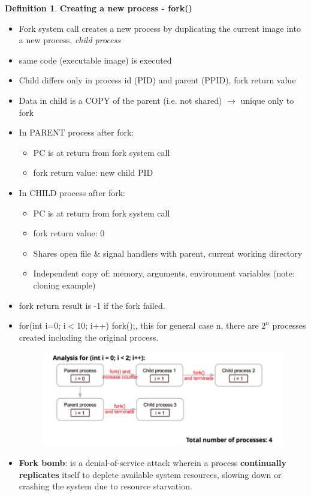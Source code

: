 \documentclass[11pt,a4paper]{article}
\theoremstyle{definition}
\newtheorem{definition}{Definition}[section]
\newenvironment{myitemize}
{ \begin{itemize}
    \setlength{\itemsep}{5pt}
    \setlength{\parskip}{0pt}
    \setlength{\parsep}{0pt}     }
{ \end{itemize}                  }
\begin{document}
\begin{definition}{\textbf{Creating a new process - \textsf{fork()}}}
	\begin{myitemize}
		\item Fork system call creates a new process by duplicating the current image into a new process, \textit{child process}
		\item \textsf{same code} (executable image) is executed
		\item Child differs only in process id (PID) and parent (PPID), fork return value
		\item Data in child is a COPY of the parent (i.e. not shared) $\rightarrow$ unique only to fork
		\item In PARENT process after fork:
		\begin{myitemize}
			\item PC is at return from fork system call
			\item fork return value: new child PID
		\end{myitemize}
		\item In CHILD process after fork:
		\begin{myitemize}
			\item PC is at return from fork system call
			\item fork return value: 0
			\item Shares open file \& signal handlers with parent, current working directory
			\item Independent copy of: memory, arguments, environment variables (note: cloning example)
		\end{myitemize}
		\item fork return result is -1 if the fork failed.
		\item \textsf{for(int i=0; i$<$10; i++) fork();}, this for general case n, there are $2^n$ processes created including the original process. 
		\begin{figure}[!h]
			\includegraphics[scale=0.3]{m1/forkBomb}
			\centering
		\end{figure}
		\item \textbf{Fork bomb}: is a denial-of-service attack wherein a process \textbf{continually replicates} itself to deplete available system resources, slowing down or crashing the system due to resource starvation.
	\end{myitemize}
\end{definition}
\end{document}
